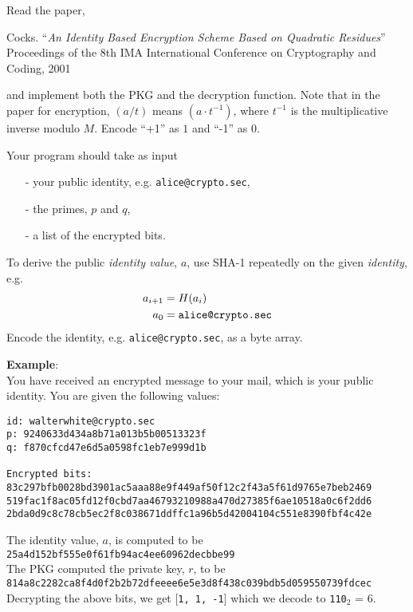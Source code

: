 \documentclass{article}
\begin{document}
\begin{description}
{    Read the paper,
    \begin{center}
	\begin{minipage}{0.8\textwidth}
	Cocks. ``\emph{An Identity Based Encryption Scheme Based on Quadratic Residues}'' 
    Proceedings of the 8th IMA International Conference on Cryptography and Coding, 2001
	\end{minipage}
	\end{center}
    and implement both the PKG and the decryption function. Note that in the paper for encryption, 
    $(a / t)$ means $(a \cdot t^{-1})$, where $t^{-1}$ is the multiplicative inverse modulo $M$.
    Encode ``+1'' as $1$ and ``-1'' as $0$.
    
    Your program should take as input
    \begin{itemize}
        \item[-] your public identity, e.g. \texttt{alice@crypto.sec},
        \item[-] the primes, $p$ and $q$,
        \item[-] a list of the encrypted bits.
    \end{itemize}
    To derive the public \emph{identity value}, $a$, use SHA-1 repeatedly on the given \emph{identity}, e.g.
    \begin{align*}
    a_{i+1} &= H(a_i) \\
    a_0 &= \text{\texttt{alice@crypto.sec}}
    \end{align*}
    Encode the identity, e.g. \texttt{alice@crypto.sec}, as a byte array.
    
    \textbf{Example}:\\
    You have received an encrypted message to your mail, which is your public identity.
    You are given the following values:
    \begin{verbatim}
id: walterwhite@crypto.sec
p: 9240633d434a8b71a013b5b00513323f
q: f870cfcd47e6d5a0598fc1eb7e999d1b

Encrypted bits:
83c297bfb0028bd3901ac5aaa88e9f449af50f12c2f43a5f61d9765e7beb2469
519fac1f8ac05fd12f0cbd7aa46793210988a470d27385f6ae10518a0c6f2dd6
2bda0d9c8c78cb5ec2f8c038671ddffc1a96b5d42004104c551e8390fbf4c42e
	\end{verbatim}
    The identity value, $a$, is computed to be\\
    \texttt{25a4d152bf555e0f61fb94ac4ee60962decbbe99}\\
    The PKG computed the private key, $r$, to be\\
    \texttt{814a8c2282ca8f4d0f2b2b72dfeeee6e5e3d8f438c039bdb5d059550739fdcec}\\
    Decrypting the above bits, we get [\texttt{1, 1, -1}] which we decode to \texttt{110}$_2$ = $6$.
    
}
\end{description}
\end{document}
